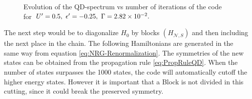 \begin{figure}[t]
	\caption{\label{Fig-Dot-Spectrum} Evolution of the QD-spectrum vs number of
	iterations of the code for $U'=0.5,\ \ep'=-0.25,\ \Gamma=2.82\times10^{-2}.$ }
\end{figure}

The next step would be to diagonalize $H_{0}$ by blocks $(H_{\mathcal{N},S})$ and then including the next place in the chain. The following Hamiltonians are generated in the same way from equation \eqref{eq:NRG-Renormalization}. The symmetries of the new states can be obtained from the propagation rule \eqref{eq:PropRuleQD}. When the number of states surpasses the 1000 states, the code will automatically cutoff the higher energy states. However it is important that a Block is not divided in this cutting, since it could break the preserved symmetry. 

